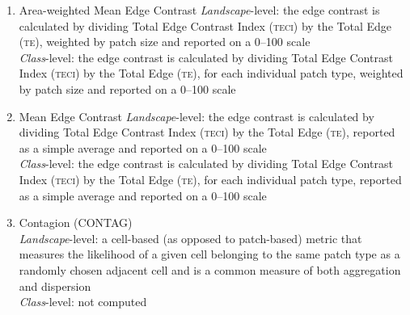 \begin{enumerate}
	\item Area-weighted Mean Edge Contrast
	\label{item:ECONAM}
	\emph{Landscape}-level: the edge contrast is calculated by dividing Total Edge Contrast Index (\textsc{teci}) by the Total Edge (\textsc{te}), weighted by patch size and reported on a 0--100 scale     \\
	\emph{Class}-level: the edge contrast is calculated by dividing Total Edge Contrast Index (\textsc{teci}) by the Total Edge (\textsc{te}), for each individual patch type, weighted by patch size and reported on a 0--100 scale        \\

	\item Mean Edge Contrast
	\label{item:ECONMN}
	\emph{Landscape}-level: the edge contrast is calculated by dividing Total Edge Contrast Index (\textsc{teci}) by the Total Edge (\textsc{te}), reported as a simple average and reported on a 0--100 scale     \\
	\emph{Class}-level:  the edge contrast is calculated by dividing Total Edge Contrast Index (\textsc{teci}) by the Total Edge (\textsc{te}), for each individual patch type, reported as a simple average and reported on a 0--100 scale         \\

	
	\item Contagion (CONTAG)\\
	\emph{Landscape}-level: a cell-based (as opposed to patch-based) metric that measures the likelihood of a given cell belonging to the same patch type as a randomly chosen adjacent cell and is a common measure of both aggregation and dispersion 	\\
	\emph{Class}-level: not computed \\ 	


\end{enumerate}
